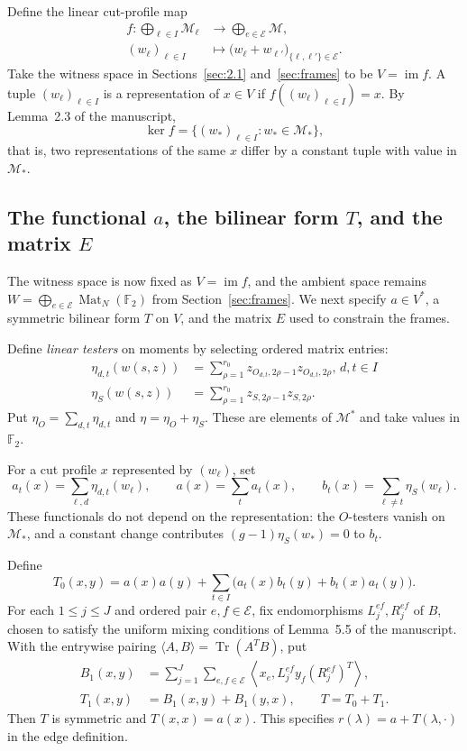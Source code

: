 \documentclass[11pt]{article}
\begin{document}
Define the linear cut-profile map
\[
\begin{aligned}
f:\bigoplus_{\ell\in I}\mathcal M_\ell&\longrightarrow\bigoplus_{e\in\mathcal E}\mathcal M,\\
(w_\ell)_{\ell\in I}&\longmapsto
\bigl(w_\ell+w_{\ell'}\bigr)_{\{\ell,\ell'\}\in\mathcal E}.
\end{aligned}
\]
Take the witness space in Sections~\ref{sec:2.1} and~\ref{sec:frames} to be $V=\operatorname{im}f$. A tuple $(w_\ell)_{\ell\in I}$ is a representation of $x\in V$ if $f((w_\ell)_{\ell\in I})=x$. By Lemma~2.3 of the manuscript,
\[
\ker f=\{(w_*)_{\ell\in I}:w_*\in \mathcal M_*\},
\]
that is, two representations of the same $x$ differ by a constant tuple with value in $\mathcal M_*$.

\subsection{The functional $a$, the bilinear form $T$, and the matrix $E$}
The witness space is now fixed as $V=\operatorname{im}f$, and the ambient space remains $W=\bigoplus_{e\in\mathcal E}\operatorname{Mat}_N(\mathbb F_2)$ from Section~\ref{sec:frames}. We next specify $a\in V^*$, a symmetric bilinear form $T$ on $V$, and the matrix $E$ used to constrain the frames.

Define \emph{linear testers} on moments by selecting ordered matrix entries:
\begin{align*}
\eta_{d,t}(w(s,z))&=\sum_{\rho=1}^{r_0}z_{O_{d,t},2\rho-1}z_{O_{d,t},2\rho},\,d,t\in I\\
\eta_S(w(s,z))&=\sum_{\rho=1}^{r_0}z_{S,2\rho-1}z_{S,2\rho}.
\end{align*}
Put $\eta_O=\sum_{d,t}\eta_{d,t}$ and $\eta=\eta_O+\eta_S$. These are elements of $\mathcal M^*$ and take values in $\mathbb F_2$. 

For a cut profile $x$ represented by $(w_\ell)$, set
\[
a_t(x)=\sum_{\ell,d}\eta_{d,t}(w_\ell),\qquad
a(x)=\sum_t a_t(x),\qquad
b_t(x)=\sum_{\ell\ne t}\eta_S(w_\ell).
\]
These functionals do not depend on the representation: the $O$-testers vanish on $\mathcal M_*$, and a constant change contributes $(g-1)\eta_S(w_*)=0$ to $b_t$.

Define
\[
T_0(x,y)=a(x)a(y)+\sum_{t\in I}
\bigl(a_t(x)b_t(y)+b_t(x)a_t(y)\bigr).
\]
For each $1\le j\le J$ and ordered pair $e,f\in\mathcal E$, fix endomorphisms $L_j^{ef},R_j^{ef}$ of $B$, chosen to satisfy the uniform mixing conditions of Lemma~5.5 of the manuscript. With the entrywise pairing $\langle A,B\rangle=\operatorname{Tr}(A^TB)$, put
\begin{align*}
B_1(x,y)&=\sum_{j=1}^J\sum_{e,f\in\mathcal E}
\left\langle x_e,L_j^{ef}y_f(R_j^{ef})^T\right\rangle,\\
T_1(x,y)&=B_1(x,y)+B_1(y,x),\qquad T=T_0+T_1.
\end{align*}
Then $T$ is symmetric and $T(x,x)=a(x)$. This specifies $r(\lambda)=a+T(\lambda,\cdot)$ in the edge definition.
\end{document}
